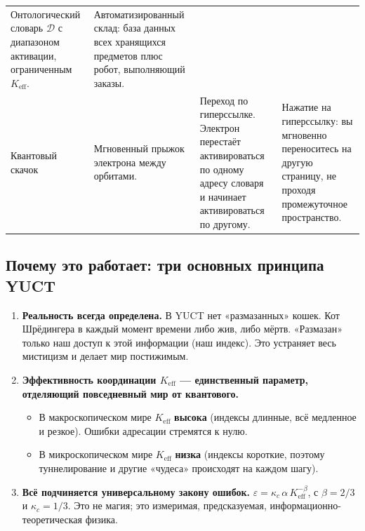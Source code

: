 \documentclass[12pt,a4paper]{article}
\theoremstyle{remark}
\begin{document}
\begin{table}[H]
\begin{tabularx}{\textwidth}{p{2.8cm} p{3.0cm} p{4.5cm} p{4.5cm}}
			Онтологический словарь \( \mathcal{D} \) с диапазоном активации, ограниченным \( K_{\mathrm{eff}} \). &
			Автоматизированный склад: база данных всех хранящихся предметов плюс робот, выполняющий заказы. \\
			\addlinespace
			Квантовый скачок &
			Мгновенный прыжок электрона между орбитами. &
			Переход по гиперссылке. Электрон перестаёт активироваться по одному адресу словаря и начинает активироваться по другому. &
			Нажатие на гиперссылку: вы мгновенно переноситесь на другую страницу, не проходя промежуточное пространство. \\
			\bottomrule
		\end{tabularx}
	\end{table}
	
	\subsection{Почему это работает: три основных принципа YUCT}
	
	\begin{enumerate}[leftmargin=*]
		\item \textbf{Реальность всегда определена.}
		В YUCT нет «размазанных» кошек. Кот Шрёдингера в каждый момент времени либо жив, либо мёртв. «Размазан» только наш доступ к этой информации (наш индекс). Это устраняет весь мистицизм и делает мир постижимым.
		
		\item \textbf{Эффективность координации \(K_{\mathrm{eff}}\) — единственный параметр, отделяющий повседневный мир от квантового.}
		\begin{itemize}
			\item В макроскопическом мире \(K_{\mathrm{eff}}\) \textbf{высока} (индексы длинные, всё медленное и резкое). Ошибки адресации стремятся к нулю.
			\item В микроскопическом мире \(K_{\mathrm{eff}}\) \textbf{низка} (индексы короткие, поэтому туннелирование и другие «чудеса» происходят на каждом шагу).
		\end{itemize}
		
		\item \textbf{Всё подчиняется универсальному закону ошибок.}
		\( \varepsilon = \kappa_c \, \alpha \, K_{\mathrm{eff}}^{-\beta} \), с \( \beta = 2/3 \) и \( \kappa_c = 1/3 \). Это не магия; это измеримая, предсказуемая, информационно-теоретическая физика.
	\end{enumerate}
	
	\medskip
	
\end{document}
